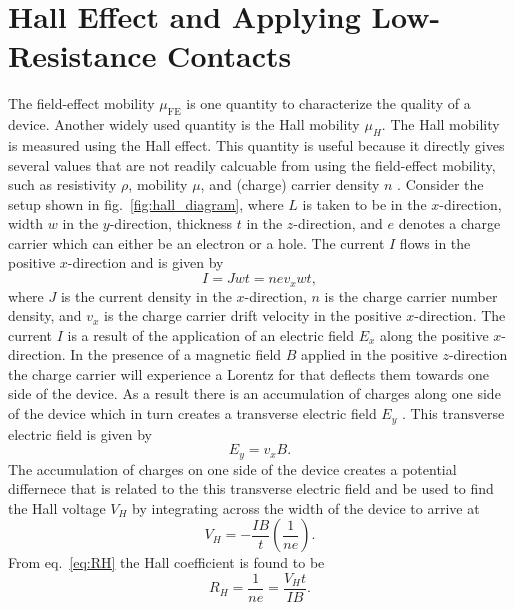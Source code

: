 \section{Hall Effect and Applying Low-Resistance Contacts}\label{sec:hall_effect_intro}
The field-effect mobility $\mu_\mathrm{FE}$ is one quantity to characterize the quality of a device. Another widely used quantity is the Hall mobility $\mu_H$. The Hall mobility is measured using the Hall effect. This quantity is useful because it directly gives several values that are not readily calcuable from using the field-effect mobility, such as resistivity $\rho$, mobility $\mu$, and (charge) carrier density $n$ \cite{Schroder_Semiconductor2006}. Consider the setup shown in fig.~\ref{fig:hall_diagram}, where $L$ is taken to be in the $x$-direction, width $w$ in the $y$-direction, thickness $t$ in the $z$-direction, and $e$ denotes a charge carrier which can either be an electron or a hole. The current $I$ flows in the positive $x$-direction and is given by
\begin{equation}\label{eq:current}
	I = J w t = n e v_x w t,
\end{equation}
where $J$ is the current density in the $x$-direction, $n$ is the charge carrier number density, and $v_x$ is the charge carrier drift velocity in the positive $x$-direction. The current $I$ is a result of the application of an electric field $E_x$ along the positive $x$-direction. In the presence of a magnetic field $B$ applied in the positive $z$-direction the charge carrier will experience a Lorentz for that deflects them towards one side of the device. As a result there is an accumulation of charges along one side of the device which in turn creates a transverse electric field $E_y$ \cite{Melissinos_Experiments1966}. This transverse electric field is given by
\begin{equation}\label{eq:Ey}
	E_y = v_x B.
\end{equation}
The accumulation of charges on one side of the device creates a potential differnece that is related to the this transverse electric field and be used to find the Hall voltage $V_H$ by integrating across the width of the device to arrive at
\begin{equation}\label{eq:V_H}
	V_H = -\frac{IB}{t}\left(\frac{1}{ne}\right).
\end{equation}
From eq.~\ref{eq:RH} the Hall coefficient is found to be
\begin{equation}\label{eq:RH}
	R_H = \frac{1}{ne} = \frac{V_H t}{IB}.
\end{equation}
